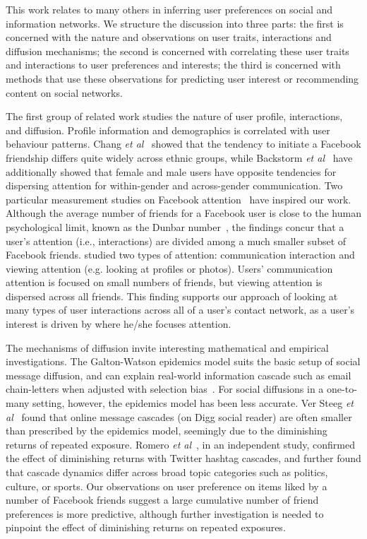 
This work relates to many others in inferring user preferences on
social and information networks.  We structure the discussion into
three parts: the first is concerned with the nature and observations
on user traits, interactions and diffusion mechanisms; the second is
concerned with correlating these user traits and interactions to user
preferences and interests; the third is concerned with methods that
use these observations for predicting user interest or recommending
content on social networks.

The first group of related work studies the nature of user profile,
interactions, and diffusion.  Profile information and demographics is
correlated with user behaviour patterns. Chang {\it et
al}~\cite{Chang2010ethnicity} showed that the tendency to initiate a
Facebook friendship differs quite widely across ethnic groups, while
Backstorm {\it et al}~\cite{backstrom2011center} have additionally
showed that female and male users have opposite tendencies for
dispersing attention for within-gender and across-gender
communication.  Two particular measurement studies on Facebook
attention~\cite{backstrom2011center,wilson2009user} have inspired our
work.  Although the average number of friends for a Facebook user is
close to the human psychological limit, known as the Dunbar
number~\cite{hill2003social}, the findings concur that a user's
attention (i.e., interactions) are divided among a much smaller subset
of Facebook friends. \cite{backstrom2011center} studied two types of
attention: communication interaction and viewing attention
(e.g. looking at profiles or photos). Users' communication attention
is focused on small numbers of friends, but viewing attention is
dispersed across all friends.  This finding supports our approach of
looking at many types of user interactions across all of a user's
contact network, as a user's interest is driven by where he/she
focuses attention.

The mechanisms of diffusion invite interesting mathematical and
empirical investigations.  The Galton-Watson epidemics model suits the
basic setup of social message diffusion, and can explain real-world
information cascade such as email chain-letters when adjusted with
selection bias~\cite{Golub2010selectionbiase}. For social diffusions
in a one-to-many setting, however, the epidemics model has been less
accurate. Ver Steeg {\it et al}~\cite{ver2011stops} found that online
message cascades (on Digg social reader) are often smaller than
prescribed by the epidemics model, seemingly due to the diminishing
returns of repeated exposure. Romero {\it et
al}~\cite{Romero2011hashtag}, in an independent study, confirmed the
effect of diminishing returns with Twitter hashtag cascades, and
further found that cascade dynamics differ across broad topic
categories such as politics, culture, or sports.  Our observations on
user preference on items liked by a number of Facebook friends suggest
a large cumulative number of friend preferences is more predictive,
although further investigation is needed to pinpoint the effect of
diminishing returns on repeated exposures.

